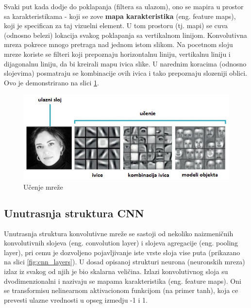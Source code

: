\documentclass[a4paper]{article}
\begin{document}
Svaki put kada dodje do poklapanja (filtera sa ulazom), ono se mapira u prostor sa karakteristikama - koji se zove \textbf{mapa karakteristika} (eng. feature maps), koji je specifican za taj vizuelni element. U tom prostoru (tj. mapi) se cuva (odnosno belezi) lokacija svakog poklapanja sa vertikalnom linijom. Konvolutivna mreza pokrece mnogo pretraga nad jednom istom slikom. Na pocetnom sloju mreze koriste se filteri koji prepoznaju horizontalnu liniju, vertikalnu liniju i dijagonalnu liniju, da bi kreirali mapu ivica slike. U narednim koracima (odnosno slojevima) posmatraju se kombinacije ovih ivica i tako prepoznaju slozeniji oblici. Ovo je demonstrirano na slici \ref{fig:learning}.

\begin{figure}[h!]
\begin{center}
\includegraphics[scale=0.9]{learning.jpg}
\end{center}
\caption{Učenje mreže}
\label{fig:learning}
\end{figure}


\subsection{Unutrasnja struktura CNN}

Unutrasnja struktura konvolutivne mreže se sastoji od nekoliko naizmeničnih konvolutivnih slojeva (eng. convolution layer) i slojeva agregacije (eng. pooling layer), pri cemu je dozvoljeno pojavljivanje iste vrste sloja vise puta (prikazano na slici \ref{fig:cnn_layers}). U dosad opisanoj strukturi neurona (neuronskih mreza) izlaz iz svakog od njih je bio skalarna veličina. Izlazi konvolutivnog sloja su dvodimenzionalni i nazivaju se mapama karakteristika (eng. feature maps). Oni se transformisu nelinearnom aktivacionom funkcijom (na primer tanh), koja ce prevesti ulazne vrednosti u opseg izmedju -1 i 1.

\end{document}
